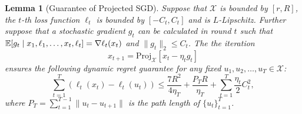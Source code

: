\documentclass[11pt,fullpage,letterpaper]{article} %
\newtheorem{lemma}[theorem]{Lemma}
\renewcommand{\bm}[1]{#1}%
\newcommand{\E}{\operatornamewithlimits{\mathbb{E}}}
\begin{document}
\begin{lemma}[Guarantee of Projected SGD]\label{lem:SGD with adaptive LR}
Suppose that $\mathcal X$ is bounded by $[r,R]$, the $t$-th loss function $\ell_t$ is bounded by $[-C_t,C_t]$ and is $L$-Lipschitz. Further suppose that a stochastic gradient $\bm g_t$ can be calculated in round $t$ such that $\E[\bm g_t\mid \bm x_1,\ell_1,\ldots,\bm x_t,\ell_t]=\nabla \ell_t(\bm x_t)$ and $\lVert \bm g_t\rVert_2\le C_t$. The the iteration
\begin{equation*}
\bm x_{t+1}=\text{Proj}_{\mathcal X}\left [\bm x_t-\eta_t \bm g_t\right ]
\end{equation*}
ensures the following dynamic regret guarantee for any fixed $\bm u_1,\bm u_2,\ldots,\bm u_T\in \mathcal X$:
\begin{equation*}
\sum_{t=1}^T (\ell_t(\bm x_t)-\ell_t(\bm u_t))\le \frac{7R^2}{4\eta_T}+\frac{P_T R}{\eta_T}+\sum_{t=1}^T \frac{\eta_t}{2} C_t^2,
\end{equation*}
where $P_T=\sum_{t=1}^{T-1}\lVert \bm u_t-\bm u_{t+1}\rVert$ is the path length of $\{\bm u_t\}_{t=1}^T$.
\end{lemma}
\end{document}
